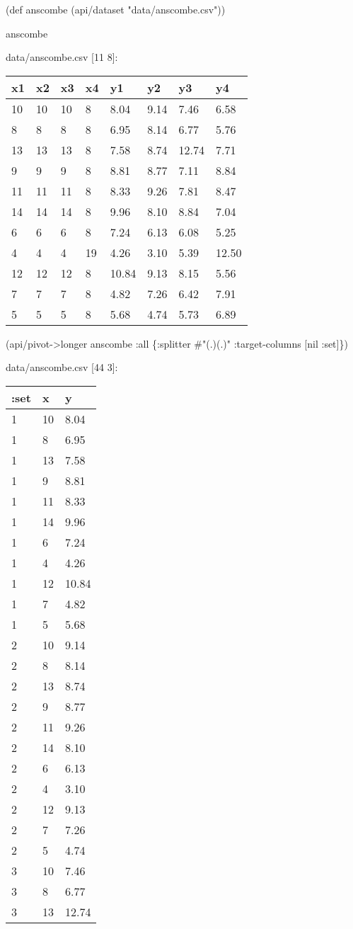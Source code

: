 \documentclass[]{article}
\newenvironment{Shaded}{\begin{snugshade}}{\end{snugshade}}
\newcommand{\AttributeTok}[1]{\textcolor[rgb]{0.77,0.63,0.00}{#1}}
\newcommand{\BuiltInTok}[1]{#1}
\newcommand{\FunctionTok}[1]{\textcolor[rgb]{0.00,0.00,0.00}{#1}}
\newcommand{\NormalTok}[1]{#1}
\newcommand{\SpecialStringTok}[1]{\textcolor[rgb]{0.31,0.60,0.02}{#1}}
\newcommand{\StringTok}[1]{\textcolor[rgb]{0.31,0.60,0.02}{#1}}
\newcommand{\VariableTok}[1]{\textcolor[rgb]{0.00,0.00,0.00}{#1}}
\begin{document}
\begin{Shaded}
\begin{Highlighting}[]
\NormalTok{(}\BuiltInTok{def}\FunctionTok{ anscombe }\NormalTok{(api/dataset }\StringTok{"data/anscombe.csv"}\NormalTok{))}
\end{Highlighting}
\end{Shaded}

\begin{Shaded}
\begin{Highlighting}[]
\NormalTok{anscombe}
\end{Highlighting}
\end{Shaded}

data/anscombe.csv {[}11 8{]}:

\begin{longtable}[]{@{}llllllll@{}}
\toprule
x1 & x2 & x3 & x4 & y1 & y2 & y3 & y4\tabularnewline
\midrule
\endhead
10 & 10 & 10 & 8 & 8.04 & 9.14 & 7.46 & 6.58\tabularnewline
8 & 8 & 8 & 8 & 6.95 & 8.14 & 6.77 & 5.76\tabularnewline
13 & 13 & 13 & 8 & 7.58 & 8.74 & 12.74 & 7.71\tabularnewline
9 & 9 & 9 & 8 & 8.81 & 8.77 & 7.11 & 8.84\tabularnewline
11 & 11 & 11 & 8 & 8.33 & 9.26 & 7.81 & 8.47\tabularnewline
14 & 14 & 14 & 8 & 9.96 & 8.10 & 8.84 & 7.04\tabularnewline
6 & 6 & 6 & 8 & 7.24 & 6.13 & 6.08 & 5.25\tabularnewline
4 & 4 & 4 & 19 & 4.26 & 3.10 & 5.39 & 12.50\tabularnewline
12 & 12 & 12 & 8 & 10.84 & 9.13 & 8.15 & 5.56\tabularnewline
7 & 7 & 7 & 8 & 4.82 & 7.26 & 6.42 & 7.91\tabularnewline
5 & 5 & 5 & 8 & 5.68 & 4.74 & 5.73 & 6.89\tabularnewline
\bottomrule
\end{longtable}

\begin{Shaded}
\begin{Highlighting}[]
\NormalTok{(api/pivot->longer anscombe }\AttributeTok{:all}\NormalTok{ \{}\AttributeTok{:splitter} \SpecialStringTok{#"(.)(.)"}
                                  \AttributeTok{:target-columns}\NormalTok{ [}\VariableTok{nil} \AttributeTok{:set}\NormalTok{]\})}
\end{Highlighting}
\end{Shaded}

data/anscombe.csv {[}44 3{]}:

\begin{longtable}[]{@{}lll@{}}
\toprule
:set & x & y\tabularnewline
\midrule
\endhead
1 & 10 & 8.04\tabularnewline
1 & 8 & 6.95\tabularnewline
1 & 13 & 7.58\tabularnewline
1 & 9 & 8.81\tabularnewline
1 & 11 & 8.33\tabularnewline
1 & 14 & 9.96\tabularnewline
1 & 6 & 7.24\tabularnewline
1 & 4 & 4.26\tabularnewline
1 & 12 & 10.84\tabularnewline
1 & 7 & 4.82\tabularnewline
1 & 5 & 5.68\tabularnewline
2 & 10 & 9.14\tabularnewline
2 & 8 & 8.14\tabularnewline
2 & 13 & 8.74\tabularnewline
2 & 9 & 8.77\tabularnewline
2 & 11 & 9.26\tabularnewline
2 & 14 & 8.10\tabularnewline
2 & 6 & 6.13\tabularnewline
2 & 4 & 3.10\tabularnewline
2 & 12 & 9.13\tabularnewline
2 & 7 & 7.26\tabularnewline
2 & 5 & 4.74\tabularnewline
3 & 10 & 7.46\tabularnewline
3 & 8 & 6.77\tabularnewline
3 & 13 & 12.74\tabularnewline
\bottomrule
\end{longtable}
\end{document}
